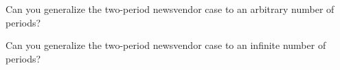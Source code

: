 \begin{exercise}
\end{exercise}

\begin{exercise}
Can you generalize the two-period newsvendor case to an arbitrary number of periods?

\end{exercise}

\begin{exercise}
Can you generalize the two-period newsvendor case to an infinite number of periods?

\end{exercise}


